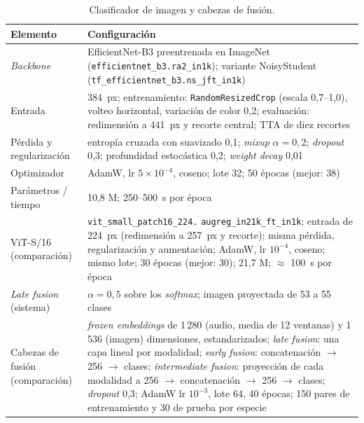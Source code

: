 \begin{table}[H]
  \centering\small
  \caption{Clasificador de imagen y cabezas de fusión.}
  \label{tab:hp-imagen}
  \begin{tabularx}{\textwidth}{@{}>{\raggedright\arraybackslash}p{3.1cm} X@{}}
    \toprule
    Elemento & Configuración \\
    \midrule
    \textit{Backbone} & EfficientNet-B3 preentrenada en ImageNet (\texttt{efficientnet\_b3.ra2\_in1k}); variante NoisyStudent (\texttt{tf\_efficientnet\_b3.ns\_jft\_in1k}) \\
    Entrada & \SI{384}{px}; entrenamiento: \texttt{RandomResizedCrop} (escala 0,7--1,0), volteo horizontal, variación de color 0,2; evaluación: redimensión a \SI{441}{px} y recorte central; TTA de diez recortes \\
    Pérdida y regularización & entropía cruzada con suavizado 0,1; \textit{mixup} $\alpha = 0{,}2$; \textit{dropout} 0,3; profundidad estocástica 0,2; \textit{weight decay} 0,01 \\
    Optimizador & AdamW, lr $5 \times 10^{-4}$, coseno; lote 32; 50 épocas (mejor: 38) \\
    Parámetros / tiempo & 10,8 M; 250--\SI{500}{\second} por época \\
    ViT-S/16 (comparación) & \texttt{vit\_small\_patch16\_224.} \texttt{augreg\_in21k\_ft\_in1k}; entrada de \SI{224}{px} (redimensión a \SI{257}{px} y recorte); misma pérdida, regularización y aumentación; AdamW, lr $10^{-4}$, coseno; mismo lote; 30 épocas (mejor: 30); 21,7 M; $\approx$ \SI{100}{\second} por época \\
    \midrule
    \textit{Late fusion} (sistema) & $\alpha = 0{,}5$ sobre los \textit{softmax}; imagen proyectada de 53 a 55 clases \\
    Cabezas de fusión (comparación) & \textit{frozen embeddings} de 1\,280 (audio, media de 12 ventanas) y 1\,536 (imagen) dimensiones, estandarizados; \textit{late fusion}: una capa lineal por modalidad; \textit{early fusion}: concatenación $\to$ 256 $\to$ clases; \textit{intermediate fusion}: proyección de cada modalidad a 256 $\to$ concatenación $\to$ 256 $\to$ clases; \textit{dropout} 0,3; AdamW lr $10^{-3}$, lote 64, 40 épocas; 150 pares de entrenamiento y 30 de prueba por especie \\
    \bottomrule
  \end{tabularx}
\end{table}

